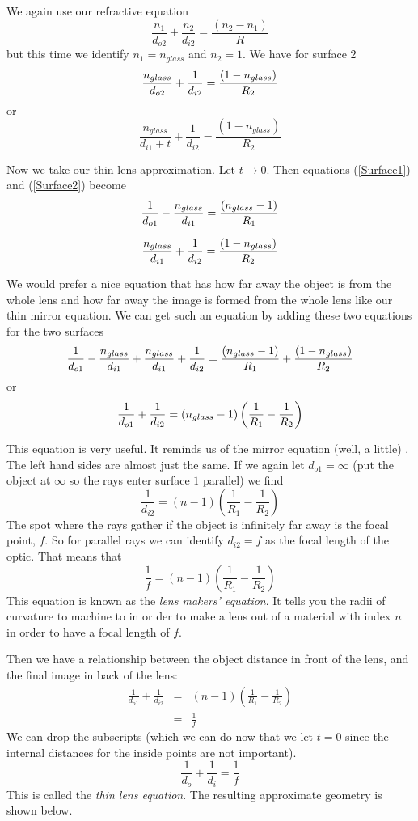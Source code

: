 \documentclass{article}
\begin{document}
We again use our refractive equation%
\[
\frac{n_{1}}{d_{o2}}+\frac{n_{2}}{d_{i2}}=\frac{\left( n_{2}-n_{1}\right) }{R%
}
\]%
but this time we identify $n_{1}=n_{glass}$ and $n_{2}=1$. We have for
surface $2$%
\begin{equation}
\frac{n_{glass}}{d_{o2}}+\frac{1}{d_{i2}}=\frac{\left( 1-n_{glass}\right) }{%
R_{2}}
\end{equation}%
or%
\begin{equation}
\frac{n_{glass}}{d_{i1}+t}+\frac{1}{d_{i2}}=\frac{\left( 1-n_{glass}\right) 
}{R_{2}}  \label{Surface2}
\end{equation}

Now we take our thin lens approximation. Let $t\rightarrow 0.$ Then
equations (\ref{Surface1}) and (\ref{Surface2}) become%
\[
\frac{1}{d_{o1}}-\frac{n_{glass}}{d_{i1}}=\frac{\left( n_{glass}-1\right) }{%
R_{1}}
\]

\[
\frac{n_{glass}}{d_{i1}}+\frac{1}{d_{i2}}=\frac{\left( 1-n_{glass}\right) }{%
R_{2}}
\]

We would prefer a nice equation that has how far away the object is from the
whole lens and how far away the image is formed from the whole lens like our
thin mirror equation. We can get such an equation by adding these two
equations for the two surfaces%
\[
\frac{1}{d_{o1}}-\frac{n_{glass}}{d_{i1}}+\frac{n_{glass}}{d_{i1}}+\frac{1}{%
d_{i2}}=\frac{\left( n_{glass}-1\right) }{R_{1}}+\frac{\left(
1-n_{glass}\right) }{R_{2}}
\]%
or%
\[
\frac{1}{d_{o1}}+\frac{1}{d_{i2}}=\left( n_{glass}-1\right) \left( \frac{1}{%
R_{1}}-\frac{1}{R_{2}}\right)
\]

This equation is very useful. It reminds us of the mirror equation (well, a
little) . The left hand sides are almost just the same. If we again let $%
d_{o1}=\infty $ (put the object at $\infty $ so the rays enter surface $1$
parallel) we find%
\[
\frac{1}{d_{i2}}=\left( n-1\right) \left( \frac{1}{R_{1}}-\frac{1}{R_{2}}%
\right)
\]%
The spot where the rays gather if the object is infinitely far away is the
focal point, $f.$ So for parallel rays we can identify $d_{i2}=f$ as the
focal length of the optic. That means that 
\[
\frac{1}{f}=\left( n-1\right) \left( \frac{1}{R_{1}}-\frac{1}{R_{2}}\right)
\]%
This equation is known as the \emph{lens makers' equation}. It tells you the
radii of curvature to machine to in or der to make a lens out of a material
with index $n$ in order to have a focal length of $f.$

Then we have a relationship between the object distance in front of the
lens, and the final image in back of the lens: 
\begin{eqnarray*}
\frac{1}{d_{o1}}+\frac{1}{d_{i2}} &=&\left( n-1\right) \left( \frac{1}{R_{1}}%
-\frac{1}{R_{2}}\right) \\
&=&\frac{1}{f}
\end{eqnarray*}%
We can drop the subscripts (which we can do now that we let $t=0$ since the
internal distances for the inside points are not important).%
\[
\frac{1}{d_{o}}+\frac{1}{d_{i}}=\frac{1}{f}
\]%
This is called the \emph{thin lens equation}. The resulting approximate
geometry is shown below.
\end{document}
